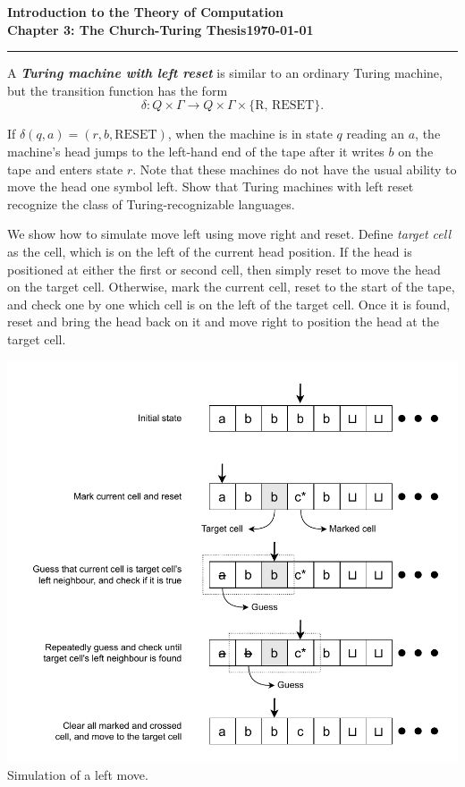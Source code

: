 \documentclass[11pt]{article}
\newcommand{\dated}{\today}
\begin{document}
\textbf{Introduction to the Theory of
Computation}\hfill\textbf{\myname}\\[0.01in]
\textbf{Chapter 3: The Church-Turing Thesis}\hfill\textbf{\dated}\\
\smallskip\hrule\bigskip

\begin{problem}{3.12}
A \textbf{\textit{Turing machine with left reset}} is similar to an ordinary Turing machine, but the transition function has the form
\[
\delta : Q \times \Gamma \longrightarrow Q \times \Gamma \times \{\text{R, RESET}\}.
\]

If $\delta(q, a) = (r, b, \text{RESET})$, when the machine is in state $q$ reading an $a$, the machine’s head jumps to the left-hand end of the tape after it writes $b$ on the tape and enters state $r$. Note that these machines do not have the usual ability to move the head one symbol left. Show that Turing machines with left reset recognize the class of Turing-recognizable languages.
\end{problem}

\begin{idea}
We show how to simulate move left using move right and reset. Define \textit{target cell} as the cell, which is on the left of the current head position. If the head is positioned at either the first or second cell, then simply reset to move the head on the target cell. Otherwise, mark the current cell, reset to the start of the tape, and check one by one which cell is on the left of the target cell. Once it is found, reset and bring the head back on it and move right to position the head at the target cell.
\begin{center}
\includegraphics[scale=0.85]{Figures/Problem3.12.pdf} \\
Simulation of a left move.
\end{center}
\end{idea}
\end{document}
